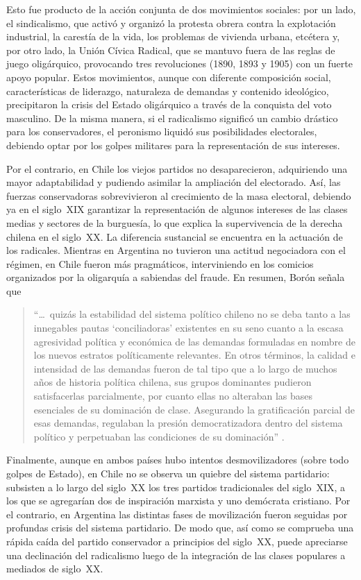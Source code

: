 {Esto fue producto de la acción conjunta de dos movimientos sociales: por un lado, el sindicalismo, que activó y organizó la protesta obrera contra la explotación industrial, la carestía de la vida, los problemas de vivienda urbana, etcétera y, por otro lado, la Unión Cívica Radical, que se mantuvo fuera de las reglas de juego oligárquico, provocando tres revoluciones (1890, 1893 y 1905) con un fuerte apoyo popular. Estos movimientos, aunque con diferente composición social, características de liderazgo, naturaleza de demandas y contenido ideológico, precipitaron la crisis del Estado oligárquico a través de la conquista del voto masculino. De la misma manera, si el radicalismo significó un cambio drástico para los conservadores, el peronismo liquidó sus posibilidades electorales, debiendo optar por los golpes militares para la representación de sus intereses.

Por el contrario, en Chile los viejos partidos no desaparecieron, adquiriendo una mayor adaptabilidad y pudiendo asimilar la ampliación del electorado. Así, las fuerzas conservadoras sobrevivieron al crecimiento de la masa electoral, debiendo ya en el siglo~XIX garantizar la representación de algunos intereses de las clases medias y sectores de la burguesía, lo que explica la supervivencia de la derecha chilena en el siglo~XX. La diferencia sustancial se encuentra en la actuación de los radicales. Mientras en Argentina no tuvieron una actitud negociadora con el régimen, en Chile fueron más pragmáticos, interviniendo en los comicios organizados por la oligarquía a sabiendas del fraude. En resumen, Borón señala que

\begin{quote}
\enquote{\dots \ quizás la estabilidad del sistema político chileno no se deba tanto a las innegables pautas \enquote{conciliadoras} existentes en su seno cuanto a la escasa agresividad política y económica de las demandas formuladas en nombre de los nuevos estratos políticamente relevantes. En otros términos, la calidad e intensidad de las demandas fueron de tal tipo que a lo largo de muchos años de historia política chilena, sus grupos dominantes pudieron satisfacerlas parcialmente, por cuanto ellas no alteraban las bases esenciales de su dominación de clase. Asegurando la gratificación parcial de esas demandas, regulaban la presión democratizadora dentro del sistema político y perpetuaban las condiciones de su dominación} \parencite[239]{1573-BORON1972}.
\end{quote}

Finalmente, aunque en ambos países hubo intentos desmovilizadores (sobre todo golpes de Estado), en Chile no se observa un quiebre del sistema partidario: subsisten a lo largo del siglo~XX los tres partidos tradicionales del siglo~XIX, a los que se agregarían dos de inspiración marxista y uno demócrata cristiano. Por el contrario, en Argentina las distintas fases de movilización fueron seguidas por profundas crisis del sistema partidario. De modo que, así como se comprueba una rápida caída del partido conservador a principios del siglo~XX, puede apreciarse una declinación del radicalismo luego de la integración de las clases populares a mediados de siglo~XX.

}
